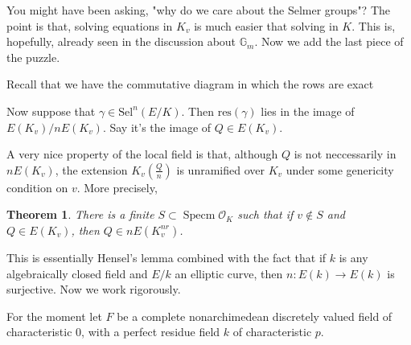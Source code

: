 \documentclass{article}
\newtheorem{thm}{Theorem}
\newtheorem{prop}[thm]{Proposition}
\newcommand{\ord}{\mathcal{O}}
\DeclareMathOperator{\spec}{Specm}
\begin{document}
You might have been asking,
"why do we care about the Selmer groups"?
The point is that, solving equations in $ K _{v} $ is much easier that
solving in $ K $.
This is, hopefully, already seen in the discussion about $ \mathbb{G}_{m} $.
Now we add the last piece of the puzzle.

Recall that we have the commutative diagram in which the rows are exact
\begin{figure}[H]
\centering
{}

\end{figure}

Now suppose that $ \gamma\in \mathrm{Sel}^{n}(E/K) $.
Then $ \mathrm{res}(\gamma) $ lies in the image of $ E (K _{v})/n E (K _{v}) $.
Say it's the image of $ Q\in E (K _{v}) $.

A very nice property of the local field is that,
although $ Q $ is not neccessarily in $ n E (K _{v}) $,
the extension $ K _{v}\left(\frac{Q}{n}\right) $ is unramified over $ K _{v} $
under some genericity condition on $ v $.
More precisely,

\begin{thm}
There is a finite $ S\subset \spec \ord _{K} $ such that
if $ v\not\in S $ and $ Q\in E (K _{v}) $,
then $ Q\in n E (K _{v}^{nr}) $.
\end{thm}

This is essentially Hensel's lemma combined with the fact that
if $ k $ is any algebraically closed field and
$ E/k $ an elliptic curve,
then $ n: E (k)\to E (k) $ is surjective.
Now we work rigorously.

For the moment let $ F $ be a 
complete nonarchimedean discretely valued field of characteristic $ 0 $,
with a perfect residue field $ k $ of characteristic $ p $.
\end{document}
